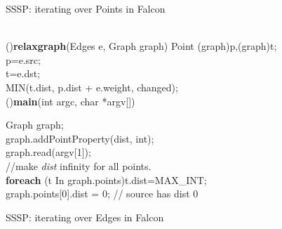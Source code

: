 \begin{figure}
\begin{minipage}[t]{0.45\textwidth}
\begin{algorithm}[H]
{{        }\label{line:ssspendlopp}

        }
\caption{SSSP: iterating over Points in Falcon}
\label{background:algo1}
\end{algorithm}
\end{minipage}\hfill
\begin{minipage}[t]{0.45\textwidth}
\begin{algorithm}[H]
\small
{}
\fontsize{8.2pt}{5pt}\\
\Fn(){\textbf{relaxgraph}(Edges  e, Graph  graph)} {
        Point (graph)p,(graph)t;\\
    p=e.src;\\
    t=e.dst;\\
    MIN(t.dist, p.dist + e.weight, changed);    \label{line:emodidist}\\%
}
\Fn(){\textbf{main}(int argc, char *argv[])} {
        Graph graph;    \\
        graph.addPointProperty(dist, int);      \label{line:eadd-dist}\\
        graph.read(argv[1]);            \label{line:ereadgraph}  \\
        //make {\it dist} infinity for all points.\\
        \textbf{foreach} (t In graph.points)t.dist=MAX\_INT;     \label{line:einfinity}\\
        graph.points[0].dist = 0;       // source has dist 0    \label{line:einitsource} \\
        \label{ssspendlopp}

        }
\caption{SSSP: iterating over Edges in Falcon}
\label{background:algo2}
\end{algorithm}
\end{minipage}
\end{figure}
